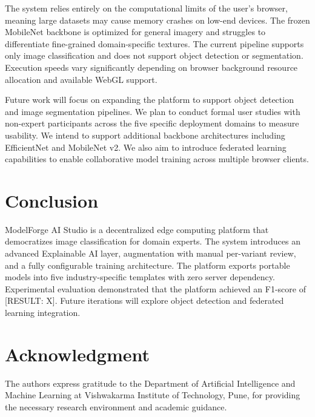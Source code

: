 \documentclass[conference]{IEEEtran}
\begin{document}
The system relies entirely on the computational limits of the user's browser, meaning large datasets may cause memory crashes on low-end devices. The frozen MobileNet backbone is optimized for general imagery and struggles to differentiate fine-grained domain-specific textures. The current pipeline supports only image classification and does not support object detection or segmentation. Execution speeds vary significantly depending on browser background resource allocation and available WebGL support.

Future work will focus on expanding the platform to support object detection and image segmentation pipelines. We plan to conduct formal user studies with non-expert participants across the five specific deployment domains to measure usability. We intend to support additional backbone architectures including EfficientNet and MobileNet v2. We also aim to introduce federated learning capabilities to enable collaborative model training across multiple browser clients.

\section{Conclusion}

ModelForge AI Studio is a decentralized edge computing platform that democratizes image classification for domain experts. The system introduces an advanced Explainable AI layer, augmentation with manual per-variant review, and a fully configurable training architecture. The platform exports portable models into five industry-specific templates with zero server dependency. Experimental evaluation demonstrated that the platform achieved an F1-score of [RESULT: X]. Future iterations will explore object detection and federated learning integration.

\section*{Acknowledgment}

The authors express gratitude to the Department of Artificial Intelligence and Machine Learning at Vishwakarma Institute of Technology, Pune, for providing the necessary research environment and academic guidance.
\end{document}
